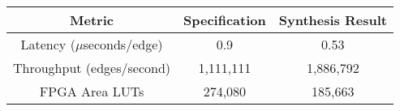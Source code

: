 \begin{table}[H]
\begin{center}
\begin{tabular}{|c|c|c|}
    \hline
    \textbf{Metric}             & \textbf{Specification} & \textbf{Synthesis Result} \\
    \hline
    Latency ($\mu$seconds/edge)  &   0.9  & \textcolor{mygreen}{0.53} \\
    \hline
    Throughput (edges/second)  &   1,111,111 & \textcolor{mygreen}{1,886,792} \\
    \hline
    FPGA Area \glspl{LUT} & 274,080  & \textcolor{mygreen}{185,663} \\
    \hline
\end{tabular}
\label{table:HBC_results}
\end{center}
\end{table}